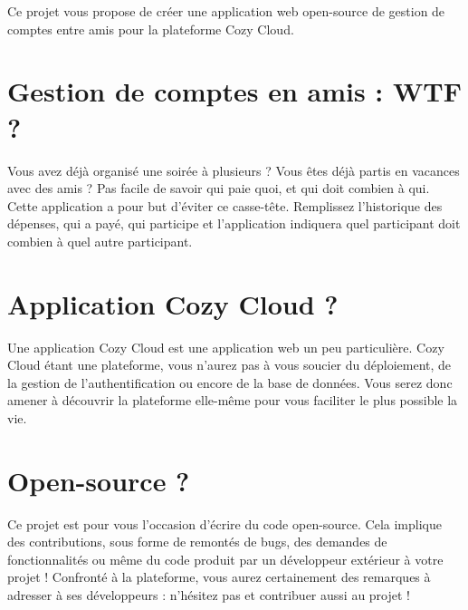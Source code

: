 \documentclass{42-fr}
\begin{document}
	Ce projet vous propose de cr\'eer une application web open-source de gestion de
	comptes entre amis pour la plateforme Cozy Cloud.

	\section{Gestion de comptes en amis : WTF ?}

		Vous avez d\'ej\`a organisé une soir\'ee \`a plusieurs ? Vous \^etes d\'ej\`a partis en
		vacances avec des amis ? Pas facile de savoir qui paie quoi, et qui doit
		combien \`a qui. Cette application a pour but d'\'eviter ce casse-t\^ete. Remplissez
		l'historique des d\'epenses, qui a pay\'e, qui participe et l'application
		indiquera quel participant doit combien \`a quel autre participant.

	\section{Application Cozy Cloud ?}

		Une application Cozy Cloud est une application web un peu particuli\`ere.
		Cozy Cloud \'etant une plateforme, vous n'aurez pas \`a vous soucier du
		d\'eploiement, de la gestion de l'authentification ou encore de la base de
		donn\'ees. Vous serez donc amener \`a d\'ecouvrir la plateforme elle-m\^eme pour
		vous faciliter le plus possible la vie.


	\section{Open-source ?}

		Ce projet est pour vous l'occasion d'\'ecrire du code open-source.
		Cela implique des contributions, sous forme de remont\'es de bugs, des
		demandes de fonctionnalit\'es ou m\^eme du code produit par un d\'eveloppeur
		ext\'erieur \`a votre projet !
		Confront\'e \`a la plateforme, vous aurez certainement des remarques \`a
		adresser \`a ses d\'eveloppeurs : n'h\'esitez pas et contribuer aussi au projet !



\end{document}
